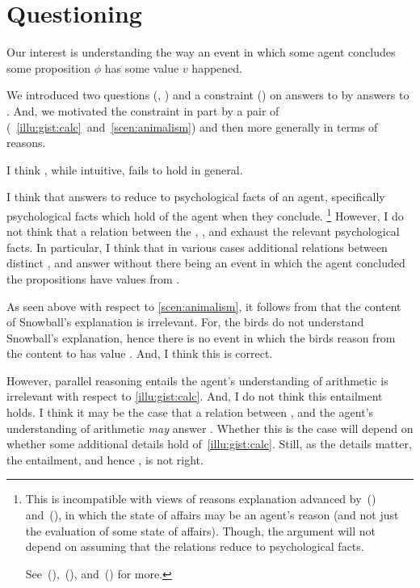 \section*{Questioning \issueInclusion{}}

\begin{note}
  Our interest is understanding the way an event in which some agent \vAgent{} concludes some proposition \(\phi\) has some value \(v\) happened.

  We introduced two questions (\qWhy{}, \qHow{}) and a constraint (\issueInclusion{}) on answers to \qWhy{} by answers to \qHow{}.
  And, we motivated the constraint in part by a pair of  (~\ref{illu:gist:calc}~and~\ref{scen:animalism}) and then more generally in terms of reasons.

  I think \issueInclusion{}, while intuitive, fails to hold in general.
\end{note}

\begin{note}
  I think that answers to \qWhy{} reduce to psychological facts of an agent, specifically psychological facts which hold of the agent when they conclude.%
  \footnote{
    This is incompatible with views of reasons explanation advanced by~(\cite{Dancy:2000aa}) and~(\cite{Alvarez:2013aa}), in which the state of affairs may be an agent's reason (and not just the evaluation of some state of affairs).
    Though, the argument will not depend on assuming that the relations reduce to psychological facts.

    See~(\cite[413--418]{Hieronymi:2011aa}),~(\cite[3--5]{DOro:2013vh}), and~(\cite[\S2]{Alvarez:2017aa}) for more.
  }
  However, I do not think that a relation between the , , and \pool{} exhaust the relevant psychological facts.
  In particular, I think that in various cases additional relations between distinct ,  and  answer \qWhy{} without there being an event in which the agent concluded the propositions have values from .
\end{note}

\begin{note}
  As seen above with respect to \autoref{scen:animalism}, it follows from \issueInclusion{} that the content of Snowball's explanation is irrelevant.
  For, the birds do not understand Snowball's explanation, hence there is no event in which the birds reason from the content to  has value .
  And, I think this is correct.

  However, parallel reasoning entails the agent's understanding of arithmetic is irrelevant with respect to \autoref{illu:gist:calc}.
  And, I do not think this entailment holds.
  I think it may be the case that a relation between \propM{\gistCalcEq{}},  and the agent's understanding of arithmetic \emph{may} answer \qWhy{}.
  Whether this is the case will depend on whether some additional details hold of~\autoref{illu:gist:calc}.
  Still, as the details matter, the entailment, and hence \issueInclusion{}, is not right.
\end{note}

